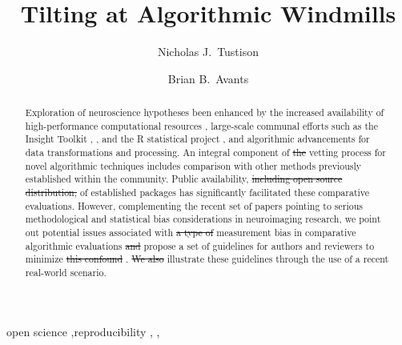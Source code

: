 \documentclass[final,5p,times,twocolumn]{elsarticle}
\newcommand{\trEdit}[1]{{\color{blue}{#1}}}
\newcommand{\trDelete}[1]{{\color{blue}\sout{#1}}}
\newcommand{\hjEdit}[1]{{\color{lightgreen}{#1}}}
\newcommand{\hjDelete}[1]{{\color{lightgreen}\sout{#1}}}
\begin{document}



\begin{frontmatter}

\title{Tilting at Algorithmic Windmills}

\author[label1]{Nicholas J.~Tustison
  }
\author[label2]{Brian B.~Avants}
\address[label1]{Department of Radiology and Medical Imaging, University of Virginia, Charlottesville, VA}
\address[label2]{Penn Image Computing and Science Laboratory, University of Pennsylvania,
                Philadelphia, PA}


\linenumbers

\begin{abstract} 
Exploration of neuroscience hypotheses \trEdit{has} been  enhanced
by the increased availability of high-performance computational resources \hjEdit{like XCEDE\ref{xcede_web_ref}}, large-scale
communal efforts such as the Insight Toolkit \hjEdit{\ref{ITKRefernce}}, \hjEdit{Slicer}, and the R statistical project \hjEdit{\ref{R_ref}}, and
algorithmic advancements for data transformations and processing. 
An integral component of \hjDelete{the} \hjEdit{a rigorous} vetting process for
novel algorithmic techniques includes comparison with other methods previously
established within the community.  Public availability, \hjDelete{including 
open source distribution,} of established packages has significantly 
facilitated these comparative evaluations\hjEdit{, particularly when the packages
provide access to an open source distribution}.  However, complementing the
recent set of papers pointing to serious methodological and statistical
bias considerations in neuroimaging research, we point out potential 
issues associated with \trDelete{a type of} measurement bias in comparative algorithmic
evaluations\hjEdit{.} \hjDelete{and } \hjEdit{In this paper we} propose a set of guidelines for authors and reviewers to minimize \hjDelete{this confound} \hjEdit{these evaluation biases}.  \hjDelete{We also} \hjEdit{Finally we} illustrate these guidelines
through the use of a recent real-world scenario.
\end{abstract}
\begin{keyword}
open science \sep reproducibility  \sep \trEdit{software} \sep \trEdit{instrument bias}
\end{keyword}

\end{frontmatter}
%
%
\newpage
\end{document}
